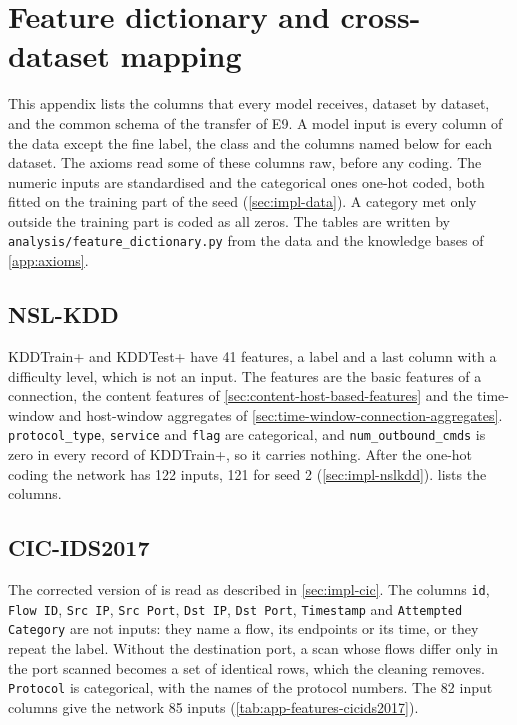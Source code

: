 \chapter{Feature dictionary and cross-dataset mapping}
\label{app:features}

This appendix lists the columns that every model receives, dataset by dataset, and the common
schema of the transfer of E9. A model input is every column of the data except the fine label,
the class and the columns named below for each dataset. The axioms read some of these columns
raw, before any coding. The numeric inputs are standardised and the categorical ones one-hot coded,
both fitted on the training part of the seed (\cref{sec:impl-data}). A category met only outside
the training part is coded as all zeros. The tables are written by
\texttt{analysis/feature\_dictionary.py} from the data and the knowledge bases of
\cref{app:axioms}.

\section{NSL-KDD}

KDDTrain+ and KDDTest+ \citep{tavallaee2009kddcup99} have 41 features, a label and a last
column with a difficulty level, which is not an input. The features are the basic
features of a connection, the content features of \cref{sec:content-host-based-features} and the
time-window and host-window aggregates of \cref{sec:time-window-connection-aggregates}.
\texttt{protocol\_type}, \texttt{service} and \texttt{flag} are categorical, and
\texttt{num\_outbound\_cmds} is zero in every record of KDDTrain+, so it carries nothing. After the
one-hot coding the network has 122 inputs, 121 for seed 2 (\cref{sec:impl-nslkdd}).
 lists the columns.

\section{CIC-IDS2017}

The corrected version of \citet{liu2022error} is read as described in \cref{sec:impl-cic}. The
columns \texttt{id}, \texttt{Flow ID}, \texttt{Src IP}, \texttt{Src Port}, \texttt{Dst IP},
\texttt{Dst Port}, \texttt{Timestamp} and \texttt{Attempted Category} are not inputs: they name a
flow, its endpoints or its time, or they repeat the label. Without the destination port, a scan
whose flows differ only in the port scanned becomes a set of identical rows, which the cleaning
removes. \texttt{Protocol} is categorical, with the names of the protocol numbers. The 82 input
columns give the network 85 inputs (\cref{tab:app-features-cicids2017}).


